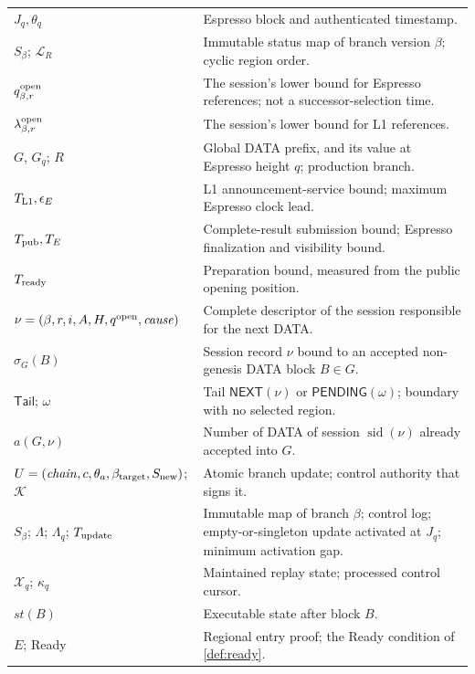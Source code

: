\documentclass[11pt,a4paper]{article}
\newcommand{\tagg}[1]{\ensuremath{\mathsf{#1}}}
\begin{document}
\begin{table}[htbp]
\begin{tabularx}{\linewidth}{@{}p{.32\linewidth}Y@{}}
$J_q,\theta_q$ & Espresso block and authenticated timestamp.\\
$S_\beta$; $\mathcal L_R$ & Immutable status map of branch version $\beta$; cyclic region order.\\
$q_{\beta,r}^{\rm open}$ & The session's lower bound for Espresso references; not a successor-selection time.\\
$\lambda_{\beta,r}^{\rm open}$ & The session's lower bound for L1 references.\\
$G$, $G_q$; $R$ & Global DATA prefix, and its value at Espresso height $q$; production branch.\\
$T_{\rm L1},\epsilon_E$ & L1 announcement-service bound; maximum Espresso clock lead.\\
$T_{\rm pub},T_E$ & Complete-result submission bound; Espresso finalization and visibility bound.\\
$T_{\rm ready}$ & Preparation bound, measured from the public opening position.\\
$\nu=(\beta,r,i,A,H,q^{\rm open},\mathit{cause})$ & Complete descriptor of the session responsible for the next DATA.\\
$\sigma_G(B)$ & Session record $\nu$ bound to an accepted non-genesis DATA block $B\in G$.\\
$\mathsf{Tail}$; $\omega$ & Tail $\tagg{NEXT}(\nu)$ or $\tagg{PENDING}(\omega)$; boundary with no selected region.\\
$a(G,\nu)$ & Number of DATA of session $\operatorname{sid}(\nu)$ already accepted into $G$.\\
$U=(\mathit{chain},c,\theta_a,\beta_{\rm target},S_{\rm new})$; $\mathcal K$ & Atomic branch update; control authority that signs it.\\
$S_\beta$; $\Lambda$; $\Lambda_q$; $T_{\rm update}$ & Immutable map of branch $\beta$; control log; empty-or-singleton update activated at $J_q$; minimum activation gap.\\
$\mathcal X_q$; $\kappa_q$ & Maintained replay state; processed control cursor.\\
$\mathit{st}(B)$ & Executable state after block $B$.\\
$E$; Ready & Regional entry proof; the Ready condition of \cref{def:ready}.\\
\bottomrule\end{tabularx}
\end{table}
\end{document}
